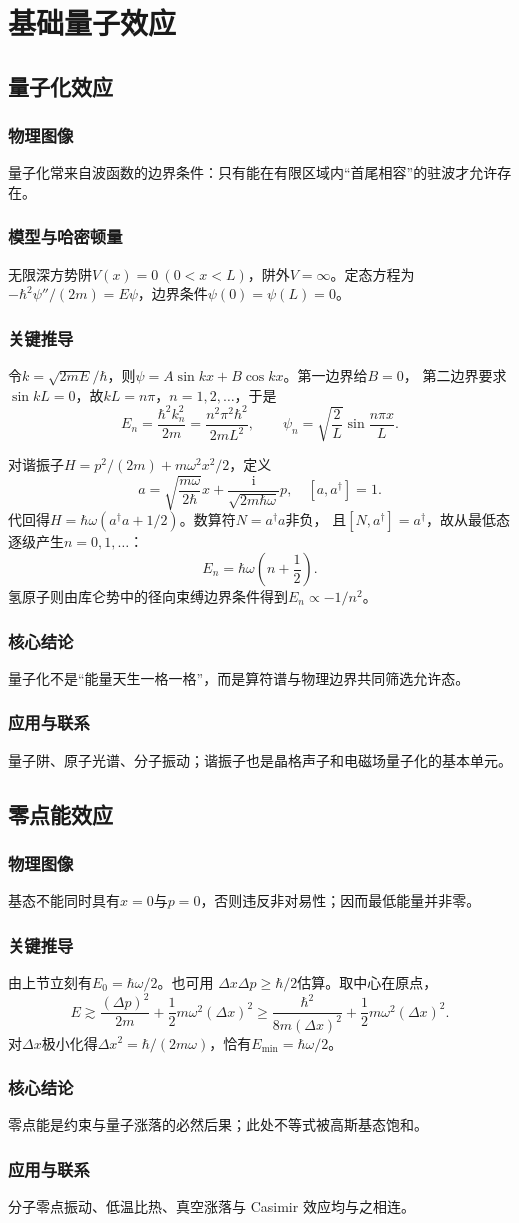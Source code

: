 \documentclass[12pt,a4paper,openany,fontset=fandol]{ctexrep}
\newcommand{\ii}{\mathrm{i}}
\newcommand{\Physical}{\subsection*{物理图像}}
\newcommand{\Model}{\subsection*{模型与哈密顿量}}
\newcommand{\Derivation}{\subsection*{关键推导}}
\newcommand{\Conclusion}{\subsection*{核心结论}}
\newcommand{\Application}{\subsection*{应用与联系}}
\begin{document}
\chapter{基础量子效应}
\section{量子化效应}
\Physical
量子化常来自波函数的边界条件：只有能在有限区域内“首尾相容”的驻波才允许存在。

\Model
无限深方势阱$V(x)=0\ (0<x<L)$，阱外$V=\infty$。定态方程为
$-\hbar^2\psi''/(2m)=E\psi$，边界条件$\psi(0)=\psi(L)=0$。

\Derivation
令$k=\sqrt{2mE}/\hbar$，则$\psi=A\sin kx+B\cos kx$。第一边界给$B=0$，
第二边界要求$\sin kL=0$，故$kL=n\pi$，$n=1,2,\ldots$，于是
\begin{equation}E_n=\frac{\hbar^2k_n^2}{2m}
=\frac{n^2\pi^2\hbar^2}{2mL^2},\qquad
\psi_n=\sqrt{\frac2L}\sin\frac{n\pi x}{L}.\end{equation}

对谐振子$H=p^2/(2m)+m\omega^2x^2/2$，定义
\[
a=\sqrt{\frac{m\omega}{2\hbar}}x+\frac{\ii}{\sqrt{2m\hbar\omega}}p,\quad
[a,a^\dagger]=1.
\]
代回得$H=\hbar\omega(a^\dagger a+1/2)$。数算符$N=a^\dagger a$非负，
且$[N,a^\dagger]=a^\dagger$，故从最低态逐级产生$n=0,1,\ldots$：
\begin{equation}E_n=\hbar\omega\left(n+\frac12\right).\end{equation}
氢原子则由库仑势中的径向束缚边界条件得到$E_n\propto-1/n^2$。

\Conclusion
量子化不是“能量天生一格一格”，而是算符谱与物理边界共同筛选允许态。
\Application
量子阱、原子光谱、分子振动；谐振子也是晶格声子和电磁场量子化的基本单元。

\section{零点能效应}
\Physical
基态不能同时具有$x=0$与$p=0$，否则违反非对易性；因而最低能量并非零。
\Derivation
由上节立刻有$E_0=\hbar\omega/2$。也可用
$\Delta x\Delta p\ge\hbar/2$估算。取中心在原点，
\[
E\gtrsim\frac{(\Delta p)^2}{2m}+\frac12m\omega^2(\Delta x)^2
\ge\frac{\hbar^2}{8m(\Delta x)^2}+\frac12m\omega^2(\Delta x)^2.
\]
对$\Delta x$极小化得$\Delta x^2=\hbar/(2m\omega)$，恰有$E_{\min}=\hbar\omega/2$。
\Conclusion
零点能是约束与量子涨落的必然后果；此处不等式被高斯基态饱和。
\Application
分子零点振动、低温比热、真空涨落与 Casimir 效应均与之相连。
\end{document}
